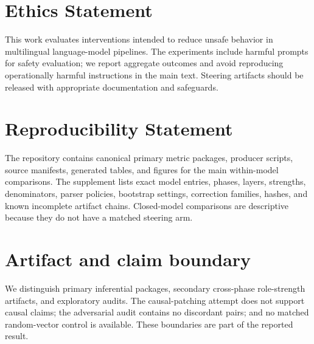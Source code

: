 \section*{Ethics Statement}
This work evaluates interventions intended to reduce unsafe behavior in multilingual language-model pipelines. The experiments include harmful prompts for safety evaluation; we report aggregate outcomes and avoid reproducing operationally harmful instructions in the main text. Steering artifacts should be released with appropriate documentation and safeguards.

\section*{Reproducibility Statement}
The repository contains canonical primary metric packages, producer scripts, source manifests, generated tables, and figures for the main within-model comparisons. The supplement lists exact model entries, phases, layers, strengths, denominators, parser policies, bootstrap settings, correction families, hashes, and known incomplete artifact chains. Closed-model comparisons are descriptive because they do not have a matched steering arm.

\section*{Artifact and claim boundary}
We distinguish primary inferential packages, secondary cross-phase role-strength artifacts, and exploratory audits. The causal-patching attempt does not support causal claims; the adversarial audit contains no discordant pairs; and no matched random-vector control is available. These boundaries are part of the reported result.
